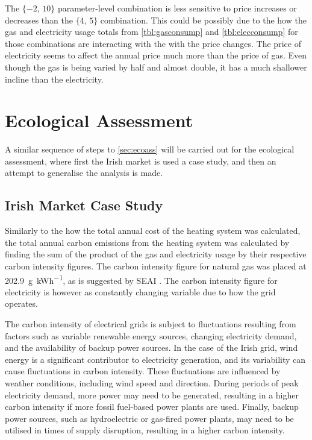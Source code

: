 The $\{-2\text{, }10\}$ parameter-level combination is less sensitive to price increases or decreases than the $\{4\text{, }5\}$ combination. This could be possibly due to the how the gas and electricity usage totals from \cref{tbl:gasconsump} and \cref{tbl:elecconsump} for those combinations are interacting with the with the price changes. The price of electricity seems to affect the annual price much more than the price of gas. Even though the gas is being varied by half and almost double, it has a much shallower incline than the electricity.





\section{Ecological Assessment}

A similar sequence of steps to \cref{sec:ecoass} will be carried out for the ecological assessment, where first the Irish market is used a case study, and then an attempt to generalise the analysis is made. 


\subsection{Irish Market Case Study} \label{subsec:irishmarket}
Similarly to the how the total annual cost of the heating system was calculated, the total annual carbon emissions from the heating system was calculated by finding the sum of the product of the gas and electricity usage by their respective carbon intensity figures. The carbon intensity figure for natural gas was placed at \qty{202.9}{\gram\per\kWh}, as is suggested by SEAI \cite{seai_conversion_nodate}. The carbon intensity figure for electricity is however as constantly changing variable due to how the grid operates. 

The carbon intensity of electrical grids is subject to fluctuations resulting from factors such as variable renewable energy sources, changing electricity demand, and the availability of backup power sources. In the case of the Irish grid, wind energy is a significant contributor to electricity generation, and its variability can cause fluctuations in carbon intensity. These fluctuations are influenced by weather conditions, including wind speed and direction. During periods of peak electricity demand, more power may need to be generated, resulting in a higher carbon intensity if more fossil fuel-based power plants are used. Finally, backup power sources, such as hydroelectric or gas-fired power plants, may need to be utilised in times of supply disruption, resulting in a higher carbon intensity.

